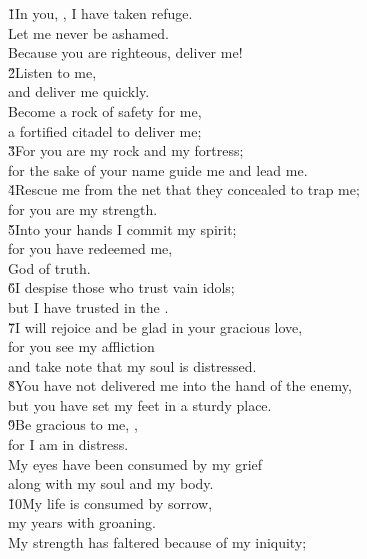 \begin{poetry}
\poeml \v{1}In you, , I have taken refuge. \\
\poemll    Let me never be ashamed. \\
\poemlll       Because you are righteous, deliver me! \\
\poeml \v{2}Listen to me, \\
\poemll    and deliver me quickly. \\
\poeml Become a rock of safety for me, \\
\poemll    a fortified citadel to deliver me; \\
\poeml \v{3}For you are my rock and my fortress; \\
\poemll    for the sake of your name guide me and lead me. \\
\poeml \v{4}Rescue me from the net that they concealed to trap me; \\
\poemll    for you are my strength. \\
\poeml \v{5}Into your hands I commit my spirit; \\
\poemll    for you have redeemed me, \\
\poemlll       {} God of truth. \\
\poeml \v{6}I despise those who trust vain idols; \\
\poemll    but I have trusted in the . \\
\poeml \v{7}I will rejoice and be glad in your gracious love, \\
\poemll    for you see my affliction \\
\poemlll       and take note that my soul is distressed. \\
\poeml \v{8}You have not delivered me into the hand of the enemy, \\
\poemll    but you have set my feet in a sturdy place. \\
\poeml \v{9}Be gracious to me, , \\
\poemll    for I am in distress. \\
\poeml My eyes have been consumed by my grief \\
\poemll    along with my soul and my body. \\
\poeml \v{10}My life is consumed by sorrow, \\
\poemll    my years with groaning. \\
\poeml My strength has faltered because of my iniquity; \\

\end{poetry}
